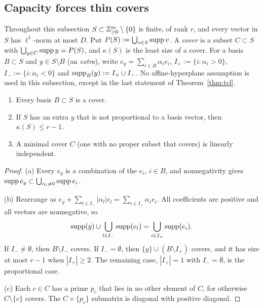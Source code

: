 \subsection{Capacity forces thin covers}\label{sec:queue-cover}

Throughout this subsection $S\subset\mathbb{Z}^m_{\ge0}\setminus\{0\}$ is finite, of rank $r$, and every vector in $S$ has
$\ell^1$-norm at most $D$. Put $P(S):=\bigcup_{v\in S}\operatorname{supp} v$. A \emph{cover} is a subset $C\subset S$ with
$\bigcup_{y\in C}\operatorname{supp} y=P(S)$, and $\kappa(S)$ is the least size of a cover. For a basis $B\subset S$ and $y\in S\setminus B$
(an \emph{extra}), write $e_y=\sum_{i\in B}\alpha_ie_i$, $I_+:=\{i:\alpha_i>0\}$, $I_-:=\{i:\alpha_i<0\}$ and
$\operatorname{supp}_B(y):=I_+\cup I_-$. No affine-hyperplane assumption is used in this subsection, except in the last statement of
Theorem~\ref{thm:tcl}.

\begin{lemma}\label{lem:covering}
\begin{enumerate}[label=\textup{(\alph*)}]
\item Every basis $B\subset S$ is a cover.
\item If $S$ has an extra $y$ that is not proportional to a basis vector, then $\kappa(S)\le r-1$.
\item A minimal cover $C$ (one with no proper subset that covers) is linearly independent.
\end{enumerate}
\end{lemma}

\begin{proof}
(a) Every $e_y$ is a combination of the $e_i$, $i\in B$, and nonnegativity gives
$\operatorname{supp} e_y\subset\bigcup_{\alpha_i\ne0}\operatorname{supp} e_i$.

(b) Rearrange as $e_y+\sum_{l\in I_-}|\alpha_l|e_l=\sum_{i\in I_+}\alpha_ie_i$. All coefficients are positive and all vectors
are nonnegative, so
\begin{equation}\label{eq:supportid}
\operatorname{supp}(y)\cup\bigcup_{l\in I_-}\operatorname{supp}(e_l)=\bigcup_{i\in I_+}\operatorname{supp}(e_i).
\end{equation}
If $I_-\ne\emptyset$, then $B\setminus I_-$ covers. If $I_-=\emptyset$, then $\{y\}\cup(B\setminus I_+)$ covers, and it has
size at most $r-1$ when $|I_+|\ge2$. The remaining case, $|I_+|=1$ with $I_-=\emptyset$, is the proportional case.

(c) Each $c\in C$ has a prime $p_c$ that lies in no other element of $C$, for otherwise $C\setminus\{c\}$ covers. The
$C\times\{p_c\}$ submatrix is diagonal with positive diagonal.
\end{proof}

